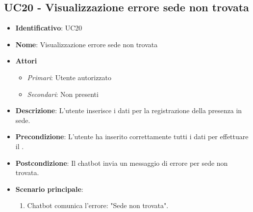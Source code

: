 \subsection{UC20 - Visualizzazione errore sede non trovata}
\begin{itemize}
	\item \textbf{Identificativo}: UC20
	\item \textbf{Nome}:  Visualizzazione errore sede non trovata
	\item \textbf{Attori}
	\begin{itemize} 
		\item \textit{Primari}: Utente autorizzato
		\item \textit{Secondari}: Non presenti
	\end{itemize}
	\item \textbf{Descrizione}: L'utente inserisce i dati per la registrazione della presenza in sede.
	\item \textbf{Precondizione}: L'utente ha inserito correttamente tutti i dati per effettuare il .
	\item \textbf{Postcondizione}: Il chatbot invia un messaggio di errore per sede non trovata. 
	\item \textbf{Scenario principale}: \begin{enumerate}
		\item Chatbot comunica l'errore: "Sede non trovata".
	\end{enumerate}
\end{itemize}
